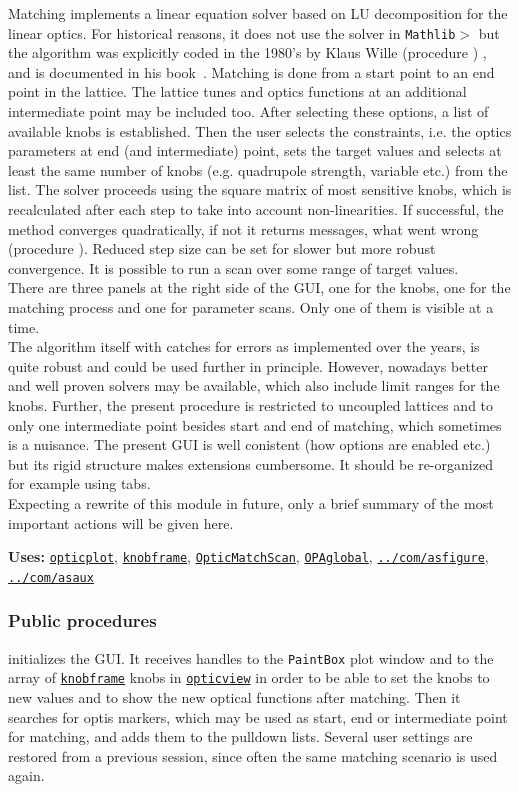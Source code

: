 \documentclass[12pt]{article}
\newcommand\code[1]{{\tt #1}}
\newcommand\guico[1]{{\color{blue}\code{#1}}}
\newcommand{\unico}[1]{{\color{burntorange}\code{#1}}}
\newcommand{\prcod}[2]{\opauni{#1}$>$\unico{#2}}
\newcommand{\opagui}[1]{\colorbox{blue!20}{\code{#1}}}
\newcommand{\ogui}[1]{\hyperref[#1]{\opagui{#1}}}
\newcommand{\opaguif}[1]{\colorbox{violet!30}{\code{#1}}}
\newcommand{\oguif}[1]{\hyperref[#1]{\opaguif{#1}}}
\newcommand{\opauni}[1]{\colorbox{orange!30}{\code{#1}}}
\newcommand{\ouni}[1]{\hyperref[#1]{\opauni{#1}}}
\newcommand{\uses}[1]{{\bf Uses: } #1}
\newcommand{\desc}[1]{#1}
\newcommand{\ppro}[1]{\subsubsection*{Public procedures} #1}
\newcommand{\todo}[1]{{\color{red} #1}}
\begin{document}
\desc{Matching implements a linear equation solver based on LU decomposition for the linear optics. For historical reasons, it does not use the solver in \prcod{Mathlib}{LUDCMP,LUBKSB} but the algorithm was explicitly coded in the 1980's by Klaus Wille (procedure \guico{Step}) , and is documented in his book~\cite{kwille}. Matching is done from a start point to an end point in the lattice. The lattice tunes and optics functions at an additional intermediate point may be included too.  After selecting these options, a list of available knobs is established. Then the user selects the constraints, i.e. the optics parameters at end (and intermediate) point, sets the target values and selects at least the same number of knobs (e.g. quadrupole strength, variable etc.) from the list. The solver proceeds using the square matrix of most sensitive knobs, which is recalculated after each step to take into account non-linearities. If successful, the method converges quadratically, if not it returns messages, what went wrong (procedure \guico{Term}). Reduced step size can be set for slower but more robust convergence. It is possible to run a scan over some range of target values. \\
There are three panels at the right side of the GUI, one for the knobs, one for the matching process and one for parameter scans. Only one of them is visible at a time.\\
\todo{The algorithm itself with catches for errors as implemented over the years, is quite robust and could be used further in principle. However, nowadays better and well proven solvers may be available, which also include limit ranges for the knobs. Further, the present procedure is restricted to uncoupled lattices and to only one intermediate point besides start and end of matching, which sometimes is a nuisance. The present GUI is well conistent (how options are enabled etc.) but its rigid structure makes extensions cumbersome. It should be re-organized for example using tabs.}\\
Expecting a rewrite of this module in future, only a brief summary of the most important actions will be given here.}

\uses{\ouni{opticplot}, \oguif{knobframe}, \ogui{OpticMatchScan}, \ouni{OPAglobal},  \oguif{../com/asfigure}, \ouni{../com/asaux}} 

\ppro{
\guico{Load} initializes the GUI. It receives handles to the \code{PaintBox} plot window and to the array of \oguif{knobframe} knobs in \ogui{opticview} in order to be able to set the knobs to new values and to show the new optical functions after matching. Then it searches for optis markers, which may be used as start, end or intermediate point for matching, and adds them to the \guico{ini/mat/midpoint} pulldown lists. Several user settings are restored from a previous session, since often the same matching scenario is used again.
}
\end{document}
